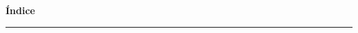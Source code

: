 \clearpage\pagestyle{empty}\normalsize
\setcounter{tocdepth}{0}

\vspace*{-0.3cm}
\begin{center}
    {\Large\bfseries\color{colorE} Índice}\\[0.03cm]
    {\color{colorH!40}\rule{0.18\textwidth}{0.7pt}}
\end{center}
\vspace{0.08cm}

\makeatletter
{}\setcounter{idx@no}{0}

\renewcommand*\l@chapter[2]{%
  \stepcounter{idx@no}%
  \noindent
  $\vcenter{\hbox{\tikz\node[fill=colorE, text=white, minimum size=4.5mm, inner sep=0pt,
      rounded corners=1.2pt, font=\scriptsize\bfseries] {\theidx@no};}}$%
  \hspace{1.5mm}%
  \parbox[t]{\dimexpr\linewidth-6mm\relax}{\color{colorA}\bfseries\footnotesize #1}%
  \par\vspace{0.6mm}}

\renewcommand*\l@section[2]{}

\begin{multicols}{2}
\end{multicols}

\makeatother

\clearpage\pagestyle{fancy}
